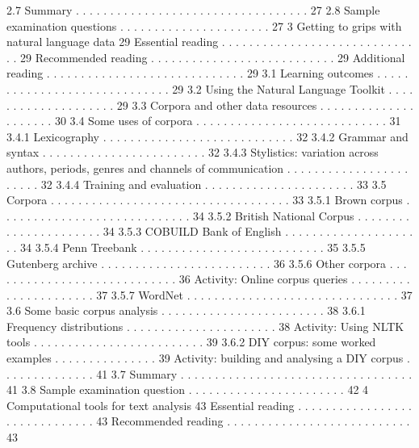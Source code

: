 2.7 Summary . . . . . . . . . . . . . . . . . . . . . . . . . . . . . . . . . . 27
2.8 Sample examination questions . . . . . . . . . . . . . . . . . . . . . . 27
3 Getting to grips with natural language data 29
Essential reading . . . . . . . . . . . . . . . . . . . . . . . . . . . . . . 29
Recommended reading . . . . . . . . . . . . . . . . . . . . . . . . . . . 29
Additional reading . . . . . . . . . . . . . . . . . . . . . . . . . . . . . 29
3.1 Learning outcomes . . . . . . . . . . . . . . . . . . . . . . . . . . . . . 29
3.2 Using the Natural Language Toolkit . . . . . . . . . . . . . . . . . . . . 29
3.3 Corpora and other data resources . . . . . . . . . . . . . . . . . . . . . 30
3.4 Some uses of corpora . . . . . . . . . . . . . . . . . . . . . . . . . . . . 31
3.4.1 Lexicography . . . . . . . . . . . . . . . . . . . . . . . . . . . . 32
3.4.2 Grammar and syntax . . . . . . . . . . . . . . . . . . . . . . . . 32
3.4.3 Stylistics: variation across authors, periods, genres and channels
of communication . . . . . . . . . . . . . . . . . . . . . . . 32
3.4.4 Training and evaluation . . . . . . . . . . . . . . . . . . . . . . 33
3.5 Corpora . . . . . . . . . . . . . . . . . . . . . . . . . . . . . . . . . . . 33
3.5.1 Brown corpus . . . . . . . . . . . . . . . . . . . . . . . . . . . . 34
3.5.2 British National Corpus . . . . . . . . . . . . . . . . . . . . . . 34
3.5.3 COBUILD Bank of English . . . . . . . . . . . . . . . . . . . . . 34
3.5.4 Penn Treebank . . . . . . . . . . . . . . . . . . . . . . . . . . . 35
3.5.5 Gutenberg archive . . . . . . . . . . . . . . . . . . . . . . . . . 36
3.5.6 Other corpora . . . . . . . . . . . . . . . . . . . . . . . . . . . . 36
Activity: Online corpus queries . . . . . . . . . . . . . . . . . . . . . . 37
3.5.7 WordNet . . . . . . . . . . . . . . . . . . . . . . . . . . . . . . . 37
3.6 Some basic corpus analysis . . . . . . . . . . . . . . . . . . . . . . . . 38
3.6.1 Frequency distributions . . . . . . . . . . . . . . . . . . . . . . 38
Activity: Using NLTK tools . . . . . . . . . . . . . . . . . . . . . . . . . 39
3.6.2 DIY corpus: some worked examples . . . . . . . . . . . . . . . 39
Activity: building and analysing a DIY corpus . . . . . . . . . . . . . . 41
3.7 Summary . . . . . . . . . . . . . . . . . . . . . . . . . . . . . . . . . . 41
3.8 Sample examination question . . . . . . . . . . . . . . . . . . . . . . . 42
4 Computational tools for text analysis 43
Essential reading . . . . . . . . . . . . . . . . . . . . . . . . . . . . . . 43
Recommended reading . . . . . . . . . . . . . . . . . . . . . . . . . . . 43
